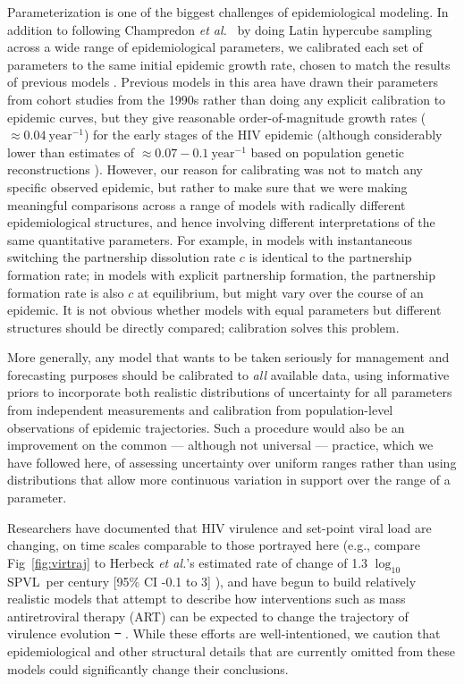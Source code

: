 \documentclass[10pt,letterpaper]{article}
\renewcommand{\figurename}{Fig}
\newcommand{\Lspvl}{$\log_{10}$ SPVL}
\newcommand{\etal}{\textit{et al.}}
\providecommand{\DIFaddtex}[1]{{\protect\color{blue}\uwave{#1}}} %
\providecommand{\DIFdeltex}[1]{{\protect\color{red}\sout{#1}}}                      %
\providecommand{\DIFaddbegin}{} %
\providecommand{\DIFaddend}{} %
\providecommand{\DIFdelbegin}{} %
\providecommand{\DIFdelend}{} %
\providecommand{\DIFadd}[1]{\texorpdfstring{\DIFaddtex{#1}}{#1}} %
\providecommand{\DIFdel}[1]{\texorpdfstring{\DIFdeltex{#1}}{}} %
\newcommand{\DIFscaledelfig}{0.5}
\newlength{\DIFdelgraphicswidth} %
\newlength{\DIFdelgraphicsheight} %
\newcommand{\DIFaddincludegraphics}[2][]{{\color{blue}\fbox{\DIFOincludegraphics[#1]{#2}}}} %
\newcommand{\DIFdelincludegraphics}[2][]{%
\sbox{\DIFdelgraphicsbox}{\DIFOincludegraphics[#1]{#2}}%
\settoboxwidth{\DIFdelgraphicswidth}{\DIFdelgraphicsbox} %
\settoboxtotalheight{\DIFdelgraphicsheight}{\DIFdelgraphicsbox} %
\scalebox{\DIFscaledelfig}{%
\parbox[b]{\DIFdelgraphicswidth}{\usebox{\DIFdelgraphicsbox}\\[-\baselineskip] \rule{\DIFdelgraphicswidth}{0em}}\llap{\resizebox{\DIFdelgraphicswidth}{\DIFdelgraphicsheight}{%
\setlength{\unitlength}{\DIFdelgraphicswidth}%
\begin{picture}(1,1)%
\thicklines\linethickness{2pt} %
{\color[rgb]{1,0,0}\put(0,0){\framebox(1,1){}}}%
{\color[rgb]{1,0,0}\put(0,0){\line( 1,1){1}}}%
{\color[rgb]{1,0,0}\put(0,1){\line(1,-1){1}}}%
\end{picture}%
}\hspace*{3pt}}} %
} %
\DeclareRobustCommand{\DIFaddbegin}{\DIFOaddbegin \let\includegraphics\DIFaddincludegraphics} %
\DeclareRobustCommand{\DIFaddend}{\DIFOaddend \let\includegraphics\DIFOincludegraphics} %
\DeclareRobustCommand{\DIFdelbegin}{\DIFOdelbegin \let\includegraphics\DIFdelincludegraphics} %
\DeclareRobustCommand{\DIFdelend}{\DIFOaddend \let\includegraphics\DIFOincludegraphics} %
\begin{document}
Parameterization is one of the biggest challenges of epidemiological
modeling. In addition to following Champredon \etal\ \cite{champredon_hiv_2013} 
by doing Latin hypercube
sampling across a wide range of epidemiological parameters, we 
calibrated each set of parameters to the same initial epidemic
growth rate, chosen to match the results of previous models
\cite{shirreff_transmission_2011}.  Previous models 
in this area have drawn their
parameters from cohort studies from the 1990s
\cite{wawer2005rates,hollingsworth_hiv1_2008}
rather than doing any explicit calibration to epidemic curves,
but they give reasonable order-of-magnitude
growth rates ($\approx 0.04~\textrm{year}^{-1}$)
for the early stages of the HIV epidemic (although considerably
lower than estimates of $\approx 0.07-0.1~\textrm{year}^{-1}$
based on population genetic reconstructions \cite{faria_early_2014}).
However, our reason for calibrating was not to match any
specific observed epidemic, but rather to make sure that
we were making meaningful comparisons across a range of
models with radically different epidemiological structures, and
hence involving different interpretations of the same quantitative
parameters.  For example, in models with instantaneous switching the
partnership dissolution rate $c$ is identical to the partnership
formation rate; in models with explicit partnership formation,
the partnership formation rate is also $c$ at equilibrium,
but might vary over the course of an epidemic.
It is not obvious whether models with equal parameters but
different structures should be directly compared; calibration
solves this problem.

More generally, any model that wants to be
taken seriously for management and forecasting purposes should
be calibrated to \emph{all} available data, using informative
priors to incorporate both realistic distributions of uncertainty
for all parameters from independent measurements \cite{elderd_uncertainty_2006}
and calibration from population-level observations of epidemic
trajectories. Such a procedure would also be an improvement on the common --- although not universal --- %
practice, which we have followed here,
of assessing uncertainty over uniform ranges rather than
using distributions that allow more continuous variation in support over
the range of a parameter.

Researchers have documented that HIV virulence and set-point viral
load are changing, on time scales comparable to those portrayed here
(e.g., compare \figurename~\ref{fig:virtraj} to Herbeck \etal's
estimated rate of change of 1.3 \Lspvl\ per century [95\% CI -0.1 to
  3] \cite{herbeck_is_2012}), and have begun to build relatively realistic models that
attempt to describe how interventions such as mass antiretroviral
therapy (ART) can be expected to change the trajectory of virulence
evolution \DIFdelbegin \DIFdel{\mbox{%
\cite{payne_impact_2014,roberts2015impact,herbeck2016evolution}}%
}\DIFdelend \DIFaddbegin \DIFadd{\mbox{%
\cite{payne_impact_2014,roberts2015impact,herbeck_evolution_2016}}%
}\DIFaddend .  While these
efforts are well-intentioned, we caution that epidemiological and
other structural details that are currently omitted from these models
could significantly change their conclusions.
\end{document}
